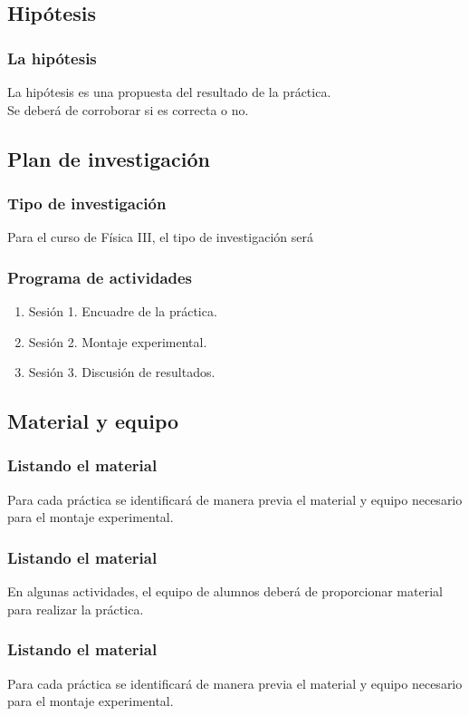 \documentclass[14pt]{beamer}
\begin{document}
\subsection{Hipótesis}


\begin{frame}
\frametitle{La hipótesis}
La hipótesis es una propuesta del resultado de la práctica.
\\
\bigskip
\pause
Se deberá de corroborar si es correcta o no.
\end{frame}

\subsection{Plan de investigación}

\begin{frame}
\frametitle{Tipo de investigación}
Para el curso de Física III, el tipo de investigación será 
\end{frame}
\begin{frame}
\frametitle{Programa de actividades}
\begin{enumerate}[<+->]
\item Sesión 1. Encuadre de la práctica.
\item Sesión 2. Montaje experimental.
\item Sesión 3. Discusión de resultados.
\end{enumerate}
\end{frame}

\subsection{Material y equipo}

\begin{frame}
\frametitle{Listando el material}
Para cada práctica se identificará de manera previa el material y equipo necesario para el montaje experimental.
\end{frame}
\begin{frame}
\frametitle{Listando el material}
En algunas actividades, el equipo de alumnos deberá de proporcionar material para realizar la práctica.
\end{frame}
\begin{frame}
\frametitle{Listando el material}
Para cada práctica se identificará de manera previa el material y equipo necesario para el montaje experimental.
\end{frame}
\end{document}
